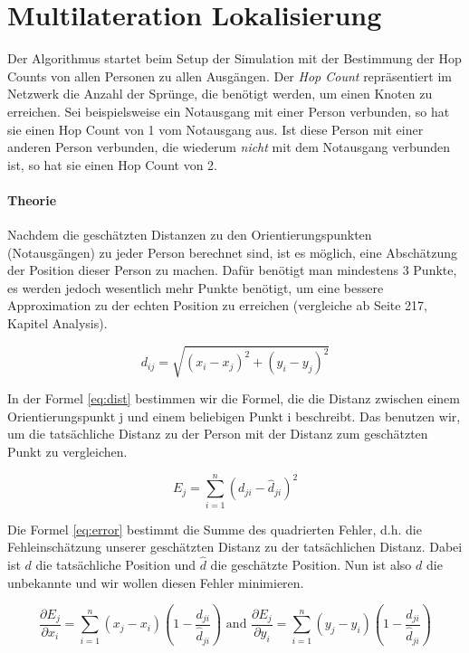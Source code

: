\section{Multilateration Lokalisierung}
\label{sec:gradient_localization}

Der Algorithmus startet beim Setup der Simulation mit der Bestimmung der Hop Counts von allen Personen zu allen Ausgängen. Der \emph{Hop Count} repräsentiert im Netzwerk die Anzahl der Sprünge, die benötigt werden, um einen Knoten zu erreichen. Sei beispielsweise ein Notausgang mit einer Person verbunden, so hat sie einen Hop Count von 1 vom Notausgang aus. Ist diese Person mit einer anderen Person verbunden, die wiederum \emph{nicht} mit dem Notausgang verbunden ist, so hat sie einen Hop Count von 2.

\paragraph{Theorie} 

Nachdem die geschätzten Distanzen zu den Orientierungspunkten (Notausgängen) zu jeder Person berechnet sind, ist es möglich, eine Abschätzung der Position dieser Person zu machen. Dafür benötigt man mindestens 3 Punkte, es werden jedoch wesentlich mehr Punkte benötigt, um eine bessere Approximation zu der echten Position zu erreichen (vergleiche \cite{Jonathan.2004} ab Seite 217, Kapitel Analysis). 

\begin{equation} \label{eq:dist}
d_{ij} = \sqrt{(x_i - x_j)^2 + (y_i - y_j)^2}
\end{equation}

In der Formel \ref{eq:dist} bestimmen wir die Formel, die die Distanz zwischen einem Orientierungspunkt j und einem beliebigen Punkt i beschreibt. Das benutzen wir, um die tatsächliche Distanz zu der Person mit der Distanz zum geschätzten Punkt zu vergleichen.

\begin{equation} \label{eq:error}
E_j = \sum_{i=1}^{n} (d_{ji} - \hat d_{ji})^2
\end{equation}

Die Formel \ref{eq:error} bestimmt die Summe des quadrierten Fehler, d.h. die Fehleinschätzung unserer geschätzten Distanz zu der tatsächlichen Distanz. Dabei ist \( d \) die tatsächliche Position und \( \hat d \) die geschätzte Position. Nun ist also \( d \) die unbekannte und wir wollen diesen Fehler minimieren.

\begin{equation} \label{eq:abl}
 \frac{\partial E_j}{\partial x_i} = \sum_{i=1}^{n}(x_j - x_i) \left( 1-\frac{d_{ji}}{\hat d_{ji}} \right) \textrm{ and }  \frac{\partial E_j}{\partial y_i} = \sum_{i=1}^{n}(y_j - y_i) \left( 1-\frac{d_{ji}}{\hat d_{ji}} \right)
\end{equation}

